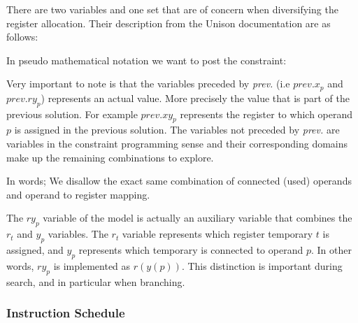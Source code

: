 There are two variables and one set that are of concern when diversifying the register
allocation. Their description from the Unison documentation are as follows:

\vspace{0.2cm}

\noindent{}

\vspace{0.2cm}

In pseudo mathematical notation we want to post the constraint:

\vspace{0.2cm}
\noindent{}
\vspace{0.2cm}

Very important to note is that the variables preceded by \textit{prev.} (i.e $prev.x_p$ and
$prev.ry_p$) represents an actual value. More precisely the value that is part of the previous
solution. For example $prev.xy_p$ represents the register to which operand $p$ is assigned
in the previous solution. The variables not preceded by \textit{prev.} are variables in
the constraint programming sense and their corresponding domains make up the remaining
combinations to explore.

In words; We disallow the exact same combination of connected (used) operands and
operand to register mapping.

The $ry_p$ variable of the model is actually an auxiliary variable that combines the
$r_t$ and $y_p$ variables. The $r_t$ variable represents which register temporary $t$ is
assigned, and $y_p$ represents which temporary is connected to operand $p$. In other words,
$ry_p$ is implemented as $r(y(p))$. This distinction is important during search, and in
particular when branching.

\subsubsection{Instruction Schedule}
\label{sec:schedule}

